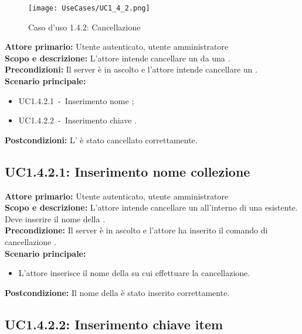 \documentclass{scalatekids-article}
\begin{document}
\begin{figure}[H]
  \begin{center}
    \texttt{[image: UseCases/UC1\_4\_2.png]}
    \caption*{Caso d'uso 1.4.2: Cancellazione }
  \end{center}
\end{figure}
\textbf{Attore primario:} Utente autenticato, utente amministratore\\
\textbf{Scopo e descrizione:} L'attore intende cancellare un  da una .\\
\textbf{Precondizioni:} Il server è in ascolto e l'attore intende cancellare un .\\
\textbf{Scenario principale:}
\begin{itemize}
\item UC1.4.2.1\ -\ Inserimento nome ;
\item UC1.4.2.2\ -\ Inserimento chiave .
\end{itemize}
\textbf{Postcondizioni:} L' è stato cancellato correttamente.

\subsection{UC1.4.2.1: Inserimento nome collezione}

\textbf{Attore primario:} Utente autenticato, utente amministratore\\
\textbf{Scopo e descrizione:} L'attore intende cancellare un  all'interno di una  esistente. Deve inserire il nome della .\\
\textbf{Precondizione:} Il server è in ascolto e l'attore ha inserito il comando di cancellazione .\\
\textbf{Scenario principale:}
\begin{itemize}
\item L'attore inserisce il nome della  su cui effettuare la cancellazione.
\end{itemize}
\textbf{Postcondizione:} Il nome della  è stato inserito correttamente.

\subsection{UC1.4.2.2: Inserimento chiave item}
\end{document}
